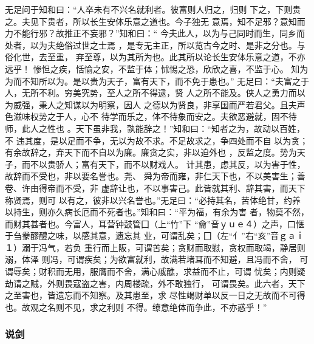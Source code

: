 \documentclass[]{article}
\begin{document}
无足问于知和曰：``人卒未有不兴名就利者。彼富则人归之，归则
下之，下则贵之。夫见下贵者，所以长生安体乐意之道也。今子独无
意焉，知不足邪？意知而力不能行邪？故推正不妄邪？''知和曰：``
今夫此人，以为与己同时而生，同乡而处者，以为夫绝俗过世之士焉
，是专无主正，所以览古今之时、是非之分也。与俗化世，去至重，
弃至尊，以为其所为也。此其所以论长生安体乐意之道，不亦远乎！
惨怛之疾，恬愉之安，不监于体；怵惕之恐，欣欣之喜，不监于心。
知为为而不知所以为。是以贵为天子，富有天下，而不免于患也。''
无足曰：``夫富之于人，无所不利。穷美究势，至人之所不得逮，贤
人之所不能及。侠人之勇力而以为威强，秉人之知谋以为明察，因人
之德以为贤良，非享国而严若君父。且夫声色滋味权势之于人，心不
待学而乐之，体不待象而安之。夫欲恶避就，固不待师，此人之性也
。天下虽非我，孰能辞之！''知和曰：``知者之为，故动以百姓，不
违其度，是以足而不争，无以为故不求。不足故求之，争四处而不自
以为贪；有余故辞之，弃天下而不自以为廉。廉贪之实，非以迫外也
，反监之度。势为天子，而不以贵骄人；富有天下，而不以财戏人。
计其患，虑其反，以为害于性，故辞而不受也，非以要名誉也。尧、
舜为帝而雍，非仁天下也，不以美害生；善卷、许由得帝而不受，非
虚辞让也，不以事害己。此皆就其利、辞其害，而天下称贤焉，则可
以有之，彼非以兴名誉也。''无足曰：``必持其名，苦体绝甘，约养
以持生，则亦久病长厄而不死者也。''知和曰：``平为福，有余为害
者，物莫不然，而财其甚者也。今富人，耳营钟鼓管囗（上``竹''下
``龠''音ｙｕｅ４）之声，口惬于刍豢醪醴之味，以感其意，遗忘其
业，可谓乱矣；囗（左``亻''右``亥''音ｇａｉ１）溺于冯气，若负
重行而上阪，可谓苦矣；贪财而取慰，贪权而取竭，静居则溺，体泽
则冯，可谓疾矣；为欲富就利，故满若堵耳而不知避，且冯而不舍，
可谓辱矣；财积而无用，服膺而不舍，满心戚醮，求益而不止，可谓
忧矣；内则疑劫请之贼，外则畏寇盗之害，内周楼疏，外不敢独行，
可谓畏矣。此六者，天下之至害也，皆遗忘而不知察。及其患至，求
尽性竭财单以反一日之无故而不可得也。故观之名则不见，求之利则
不得。缭意绝体而争此，不亦惑乎！''

\hypertarget{header-n2391}{%
\subsubsection{说剑}\label{header-n2391}}
\end{document}
